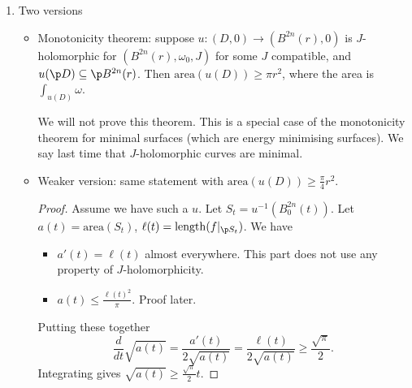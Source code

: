 \documentclass[a4paper]{article}
\begin{document}
\begin{enumerate}
  \begin{proof}
    Work in a coordinate patch. Let \(u: D \to \C^n\) is \(J\)-holomorphic for \(J: D \to \End_\R(\C^n)\). wlog \(u(0) = 0, Du_0 = 0\), i.e.\ \(0\) a critical point and \(J(0)\) is the action of \(i\) on \(\C^n\). We've assumed that \(u\) is non-constant so exists \(\ell \geq 2\) such that \(u(z) = O(|z|^\ell)\) near \(0\), \(u(z) \ne O(|z|^{\ell + 1})\). In this step we're using unique continuation property to say that all derivatives can't be zero. \(J(u(z)) = i + O(|z|^\ell)\) near \(0\). Let's look at Taylor expansion, say \(T_\ell u\), the \(\ell\)th order expansion. Taking the Taylor expansion of the Cauchy-Riemann equation
    \[
      \frac{\partial u}{\partial s} + J(u) \frac{\partial u}{\partial t} = 0,
    \]
    we obtain
    \[
      \frac{\partial (T_\ell u)}{\partial s} + i \frac{\partial (T_\ell u)}{\partial t} = 0
    \]
    so \(T_\ell u\) is holomorphic in the standard sense. By Taylor's theorem \(T_\ell u(z) = c z^\ell\) for some \(c \ne 0\), so \(u(z) = c z^\ell + O(|z|^{\ell + 1})\). Thus \(0\) is an isolated critical point. Finiteness follows from closedness of \(\Sigma\).
  \end{proof}
\item Two versions
  \begin{itemize}
  \item Monotonicity theorem: suppose \(u: (D, 0) \to (B^{2n}(r), 0)\) is \(J\)-holomorphic for \((B^{2n}(r), \omega_0, J)\) for some \(J\) compatible, and \(u(\p D) \subseteq \p B^{2n}(r)\). Then \(\mathrm{area}(u(D)) \geq \pi r^2\), where the area is \(\int_{u(D)} \omega\).

    We will not prove this theorem. This is a special case of the monotonicity theorem for minimal surfaces (which are energy minimising surfaces). We say last time that \(J\)-holomorphic curves are minimal.
  \item Weaker version: same statement with \(\mathrm{area}(u(D)) \geq \frac{\pi}{4} r^2\).

    \begin{proof}
      Assume we have such a \(u\). Let \(S_t = u^{-1}(B_0^{2n}(t))\). Let \(a(t) = \mathrm{area}(S_t)\), \(\ell(t) = \mathrm{length}(f|_{\p S_t})\). We have
      \begin{itemize}
      \item \(a'(t) = \ell(t)\) almost everywhere. This part does not use any property of \(J\)-holomorphicity.
      \item \(a(t) \leq \frac{\ell(t)^2}{\pi}\). Proof later.
      \end{itemize}
      Putting these together
      \[
        \frac{d}{dt} \sqrt{a(t)} = \frac{a'(t)}{2\sqrt{a(t)}} = \frac{\ell(t)}{2\sqrt{a(t)}} \geq \frac{\sqrt{\pi}}{2}.
      \]
      Integrating gives \(\sqrt{a(t)} \geq \frac{\sqrt \pi}{2} t\).


\end{proof}
\end{itemize}
\end{enumerate}
\end{document}
